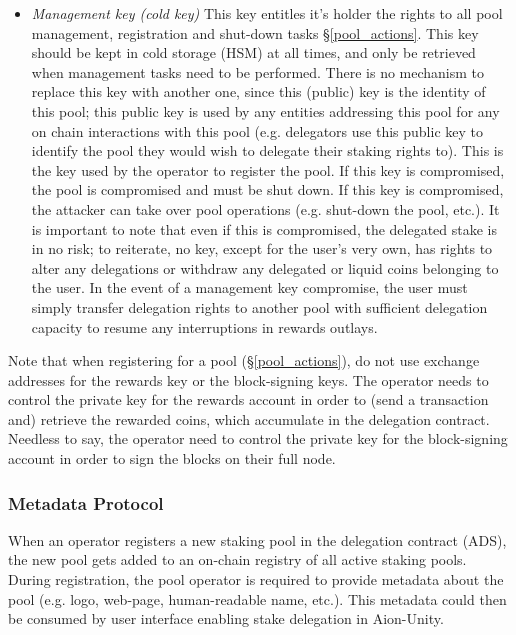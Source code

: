 \begin{itemize}
    \item \textit{Management key (cold key)} This key entitles it's holder the rights to all pool management, registration and shut-down tasks \S\ref{pool_actions}. This key should be kept in cold storage (HSM) at all times, and only be retrieved when management tasks need to be performed. There is no mechanism to replace this key with another one, since this (public) key is the identity of this pool; this public key is used by any entities addressing this pool for any on chain interactions with this pool (e.g. delegators use this public key to identify the pool they would wish to delegate their staking rights to). This is the key used by the operator to register the pool. If this key is compromised, the pool is compromised and must be shut down. If this key is compromised, the attacker can take over pool operations (e.g. shut-down the pool, etc.). It is important to note that even if this  is compromised, the delegated stake is in no risk; to reiterate, no key, except for the user's very own, has rights to alter any delegations or withdraw any delegated or liquid coins belonging to the user. In the event of a management key compromise, the user must simply transfer delegation rights to another pool with sufficient delegation capacity to resume any interruptions in rewards outlays. 
\end{itemize}

Note that when registering for a pool (\S\ref{pool_actions}), do not use exchange addresses for the rewards key or the block-signing keys. The operator needs to control the private key for the rewards account in order to (send a transaction and) retrieve the rewarded coins, which accumulate in the delegation contract. Needless to say, the operator need to control the private key for the block-signing account in order to sign the blocks on their full node.   

\subsubsection{Metadata Protocol} \label{metadata_protocol}
When an operator registers a new staking pool in the delegation contract (ADS), the new pool gets added to an on-chain registry of all active staking pools. During registration, the pool operator is required to provide metadata about the pool (e.g. logo, web-page, human-readable name, etc.). This metadata could then be consumed by user interface enabling stake delegation in Aion-Unity. 

